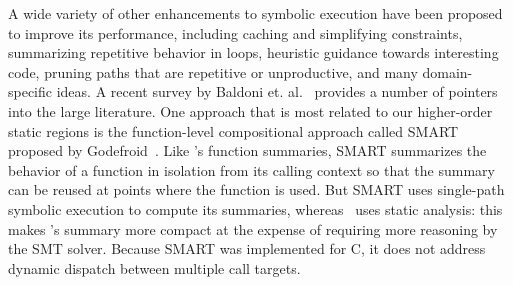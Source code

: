 A wide variety of other enhancements to symbolic execution have been
proposed to improve its performance, including caching and simplifying
constraints, summarizing repetitive behavior in loops, heuristic
guidance towards interesting code, pruning paths that are repetitive
or unproductive, and many domain-specific ideas.
%
A recent survey by Baldoni et. al.~\cite{SurveySymExec-CSUR18}
provides a number of pointers into the large literature.
%
One approach that is most related to our higher-order static regions
is the function-level compositional approach called SMART proposed by
Godefroid~\cite{Godefroid2007}.
%
Like \tool's function summaries, SMART summarizes the behavior of a
function in isolation from its calling context so that the summary can
be reused at points where the function is used.
%
But SMART uses single-path symbolic execution to compute its
summaries, whereas \tool\ uses static analysis: this makes \tool's
summary more compact at the expense of requiring more reasoning by the
SMT solver.
%
Because SMART was implemented for C, it does not address dynamic
dispatch between multiple call targets.


%

%
%
%
%
